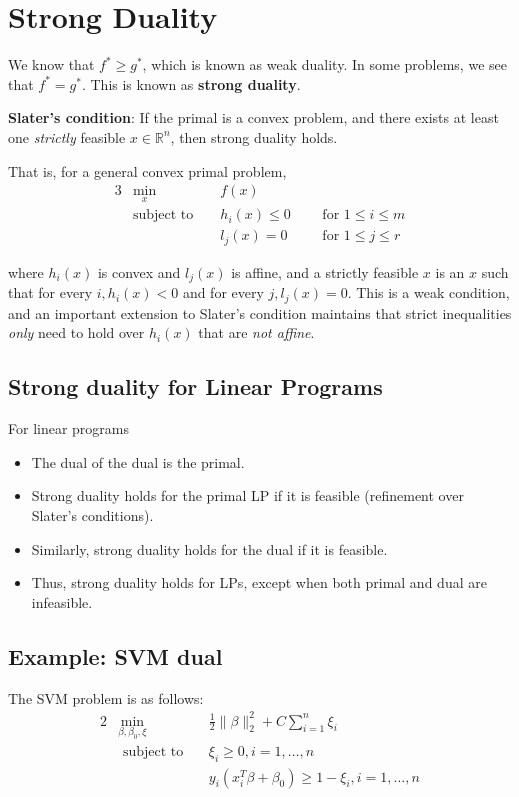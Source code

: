 \documentclass[twoside]{article}
\newcommand{\R}{\mathbb{R}}
\begin{document}
\section{Strong Duality}
We know that $f^* \geq g^*$, which is known as weak duality. In some problems, we
see that $f^* = g^*$. This is known as \textbf{strong duality}.

\textbf{Slater's condition}: If the primal is a convex problem, and there exists
at least one \textit{strictly} feasible $x \in \R^n$, then strong duality holds.

That is, for a general convex primal problem,
\begin{alignat*}{3}
&\min_x &&f(x) \\
&\text{subject to } && h_i(x) \leq 0 ~~~&&\text{for } 1 \leq i \leq m \\
&&& l_j(x) = 0 ~~~&&\text{for } 1 \leq j \leq r
\end{alignat*}

where $h_i(x)$ is convex and $l_j(x)$ is affine, and a strictly feasible $x$ is
an $x$ such that for every $i, h_i(x) < 0$ and for every
$j, l_j(x) = 0$. This is a weak condition, and an important extension to Slater's condition maintains that strict inequalities \emph{only} need to hold over $h_i\left(x\right)$ that are \emph{not affine}.

\subsection{Strong duality for Linear Programs}
For linear programs
\begin{itemize}
\item The dual of the dual is the primal.
\item Strong duality holds for the primal LP if it is feasible (refinement over Slater's conditions).
\item Similarly, strong duality holds for the dual if it is feasible.
\item Thus, strong duality holds for LPs, except when both primal and dual are infeasible.
\end{itemize}

\subsection{Example: SVM dual}
The SVM problem is as follows:
\begin{alignat*}{2}
&\min_{\beta, \beta_{0}, \xi} && \frac{1}{2} \| \beta \|^{2}_{2} + C \sum_{i=1}^{n}\xi_{i} \\
&\text{ subject to}&~& \xi_{i} \geq 0, i = 1, \dots, n \\
&&& y_{i}\left( x_{i}^{T} \beta + \beta_{0} \right) \geq 1-\xi_{i}, i = 1, \dots, n
\end{alignat*}
\end{document}
